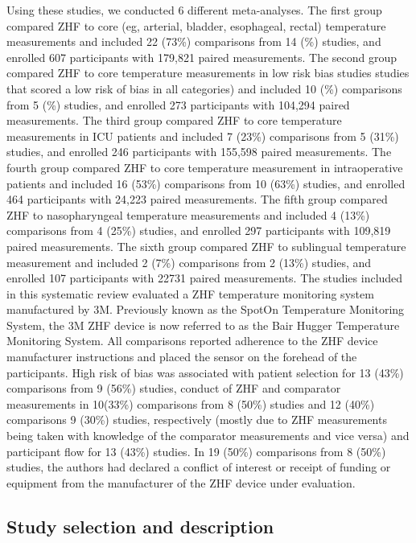 \documentclass[smallextended]{svjour3}       %
\begin{document}
Using these studies, we conducted 6 different meta-analyses. The first
group compared ZHF to core (eg, arterial, bladder, esophageal, rectal)
temperature measurements and included 22 (73\%) comparisons from 14 (\%)
studies, and enrolled 607 participants with 179,821 paired measurements.
The second group compared ZHF to core temperature measurements in low
risk bias studies studies that scored a low risk of bias in all
categories) and included 10 (\%) comparisons from 5 (\%) studies, and
enrolled 273 participants with 104,294 paired measurements. The third
group compared ZHF to core temperature measurements in ICU patients and
included 7 (23\%) comparisons from 5 (31\%) studies, and enrolled 246
participants with 155,598 paired measurements. The fourth group compared
ZHF to core temperature measurement in intraoperative patients and
included 16 (53\%) comparisons from 10 (63\%) studies, and enrolled 464
participants with 24,223 paired measurements. The fifth group compared
ZHF to nasopharyngeal temperature measurements and included 4 (13\%)
comparisons from 4 (25\%) studies, and enrolled 297 participants with
109,819 paired measurements. The sixth group compared ZHF to sublingual
temperature measurement and included 2 (7\%) comparisons from 2 (13\%)
studies, and enrolled 107 participants with 22731 paired measurements.
The studies included in this systematic review evaluated a ZHF
temperature monitoring system manufactured by 3M. Previously known as
the SpotOn Temperature Monitoring System, the 3M ZHF device is now
referred to as the Bair Hugger Temperature Monitoring System. All
comparisons reported adherence to the ZHF device manufacturer
instructions and placed the sensor on the forehead of the participants.
High risk of bias was associated with patient selection for 13 (43\%)
comparisons from 9 (56\%) studies, conduct of ZHF and comparator
measurements in 10(33\%) comparisons from 8 (50\%) studies and 12 (40\%)
comparisons 9 (30\%) studies, respectively (mostly due to ZHF
measurements being taken with knowledge of the comparator measurements
and vice versa) and participant flow for 13 (43\%) studies. In 19 (50\%)
comparisons from 8 (50\%) studies, the authors had declared a conflict
of interest or receipt of funding or equipment from the manufacturer of
the ZHF device under evaluation.

\hypertarget{study-selection-and-description}{%
\subsection{Study selection and
description}\label{study-selection-and-description}}
\end{document}
